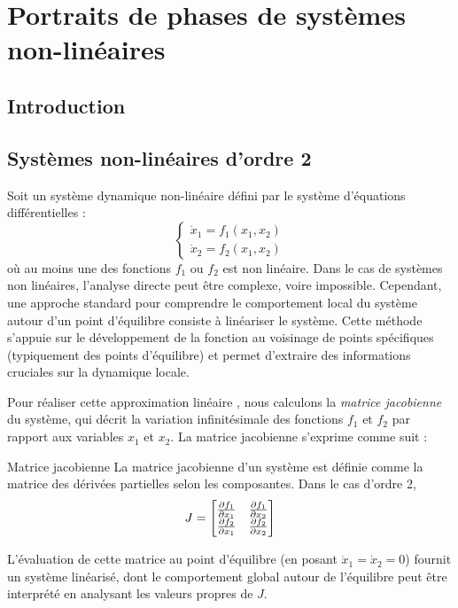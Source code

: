 \chapter{Portraits de phases de systèmes non-linéaires}
    \section{Introduction}
    \section{Systèmes non-linéaires d'ordre 2}
        Soit un système dynamique non-linéaire défini par le système d'équations différentielles :
        \begin{equation}
            \begin{cases}
                \dot{x}_1 = f_1(x_1, x_2) \\
                \dot{x}_2 = f_2(x_1, x_2)
            \end{cases}
        \end{equation}
        où au moins une des fonctions $f_1$ ou $f_2$ est non linéaire. Dans le cas de systèmes non linéaires, l'analyse directe peut être complexe, voire impossible. Cependant, une approche standard pour comprendre le comportement local du système autour d'un point d'équilibre consiste à linéariser le système. Cette méthode s'appuie sur le développement de la fonction au voisinage de points spécifiques (typiquement des points d'équilibre) et permet d'extraire des informations cruciales sur la dynamique locale.

        Pour réaliser cette approximation linéaire , nous calculons la \textit{matrice jacobienne} du système, qui décrit la variation infinitésimale des fonctions $f_1$ et $f_2$ par rapport aux variables $x_1$ et $x_2$. La matrice jacobienne s'exprime comme suit :

        \begin{definition}{Matrice jacobienne}
            La matrice jacobienne d'un système est définie comme la matrice des dérivées partielles selon les composantes. Dans le cas d'ordre 2,
            \begin{equation}
                J = 
                \begin{bmatrix}
                    \frac {\partial {f_1}}{\partial {x_1}} & \frac {\partial {f_1}}{\partial {x_2}} \\
                    \frac {\partial {f_2}}{\partial {x_1}} & \frac {\partial {f_2}}{\partial {x_2}}
                \end{bmatrix}
            \end{equation}
        \end{definition}
        L'évaluation de cette matrice au point d'équilibre (en posant $\dot{x}_1 = \dot{x}_2 = 0$) fournit un système linéarisé, dont le comportement global autour de l'équilibre peut être interprété en analysant les valeurs propres de $J$.

